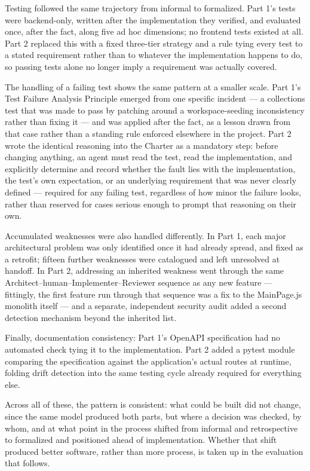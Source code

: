Testing followed the same trajectory from informal to formalized. Part 1's tests were backend-only, written after the implementation they verified, and evaluated once, after the fact, along five ad hoc dimensions; no frontend tests existed at all. Part 2 replaced this with a fixed three-tier strategy and a rule tying every test to a stated requirement rather than to whatever the implementation happens to do, so passing tests alone no longer imply a requirement was actually covered.

The handling of a failing test shows the same pattern at a smaller scale. Part 1's Test Failure Analysis Principle emerged from one specific incident --- a collections test that was made to pass by patching around a workspace-seeding inconsistency rather than fixing it --- and was applied after the fact, as a lesson drawn from that case rather than a standing rule enforced elsewhere in the project. Part 2 wrote the identical reasoning into the Charter as a mandatory step: before changing anything, an agent must read the test, read the implementation, and explicitly determine and record whether the fault lies with the implementation, the test's own expectation, or an underlying requirement that was never clearly defined --- required for any failing test, regardless of how minor the failure looks, rather than reserved for cases serious enough to prompt that reasoning on their own.

Accumulated weaknesses were also handled differently. In Part 1, each major architectural problem was only identified once it had already spread, and fixed as a retrofit; fifteen further weaknesses were catalogued and left unresolved at handoff. In Part 2, addressing an inherited weakness went through the same Architect--human--Implementer--Reviewer sequence as any new feature --- fittingly, the first feature run through that sequence was a fix to the MainPage.js monolith itself --- and a separate, independent security audit added a second detection mechanism beyond the inherited list.

Finally, documentation consistency: Part 1's OpenAPI specification had no automated check tying it to the implementation. Part 2 added a pytest module comparing the specification against the application's actual routes at runtime, folding drift detection into the same testing cycle already required for everything else.

Across all of these, the pattern is consistent: what could be built did not change, since the same model produced both parts, but where a decision was checked, by whom, and at what point in the process shifted from informal and retrospective to formalized and positioned ahead of implementation. Whether that shift produced better software, rather than more process, is taken up in the evaluation that follows.

